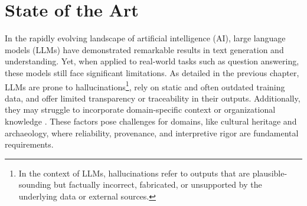 \chapter{State of the Art}
\label{chap:sota}
\begin{spacing}{1.5}
\sloppy
In the rapidly evolving landscape of artificial intelligence (AI), large language models (LLMs) have demonstrated remarkable results in text generation and understanding. Yet, when applied to real-world tasks such as question answering, these models still face significant limitations. As detailed in the previous chapter, LLMs are prone to hallucinations\footnote{In the context of LLMs, hallucinations refer to outputs that are plausible-sounding but factually incorrect, fabricated, or unsupported by the underlying data or external sources.}, rely on static and often outdated training data, and offer limited transparency or traceability in their outputs. Additionally, they may struggle to incorporate domain-specific context or organizational knowledge \citep{vaibhav_retrieval-augmented_2025}. These factors pose challenges for domains, like cultural heritage and archaeology, where reliability, provenance, and interpretive rigor are fundamental requirements.


\end{spacing}
